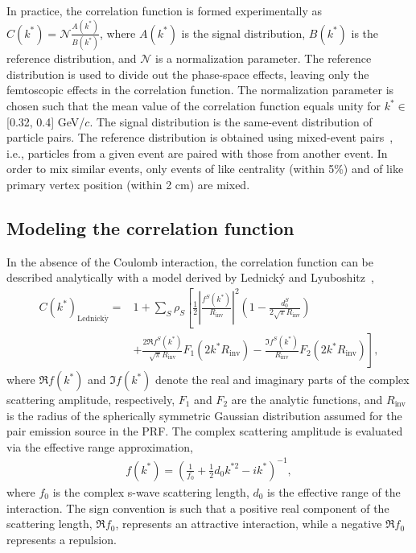 \documentclass{svproc}
\newcommand{\kstar}{$k^{*}$\xspace}
\begin{document}
In practice, the correlation function is formed experimentally as $C(k^{*}) = \mathcal{N}\frac{A(k^{*})}{B(k^{*})}$, where $A(k^{*})$ is the signal distribution, $B(k^{*})$ is the reference distribution, and $\mathcal{N}$ is a normalization parameter.  
The reference distribution is used to divide out the phase-space effects, leaving only the femtoscopic effects in the correlation function. 
The normalization parameter is chosen such that the mean value of the correlation function equals unity for \kstar $\in$ [0.32, 0.4] GeV/$c$.
The signal distribution is the same-event distribution of particle pairs.
The reference distribution is obtained using mixed-event pairs~\cite{Kopylov:1974th}, i.e., particles from a given event are paired with those from another event.
In order to mix similar events, only events of like centrality (within 5\%) and of like primary vertex position (within 2 cm) are mixed.

\subsection{Modeling the correlation function}
\label{sec:ModelingCF}

In the absence of the Coulomb interaction, the correlation function can be described analytically with a model derived by Lednick\'y and Lyuboshitz~\cite{Lednicky:82},
\begin{equation}
\begin{aligned}
C(k^{*})_{\mathrm{Lednick\acute{y}}} = &1 + \sum_{S}\rho_{S}\left[\frac{1}{2}\left|\frac{f^{S}(k^{*})}{R_{\mathrm{inv}}}\right|^2\left(1-\frac{d^{S}_{0}}{2\sqrt{\pi}R_{\mathrm{inv}}}\right) \right. \\
&+ \left. \frac{2\Re f^{S}(k^{*})}{\sqrt{\pi}R_{\mathrm{inv}}}F_{1}(2k^{*}R_{\mathrm{inv}})-\frac{\Im f^{S}(k^{*})}{R_{\mathrm{inv}}}F_{2}(2k^{*}R_{\mathrm{inv}})\right],
\end{aligned}  
\label{eqn:LednickyEqn}
\end{equation}
where $\Re f(k^{*})$ and $\Im f(k^{*})$ denote the real and imaginary parts of the complex scattering amplitude, respectively, $F_{1}$ and $F_{2}$ are the analytic functions, and $R_{\mathrm{inv}}$ is the radius of the spherically symmetric Gaussian distribution assumed for the pair emission source in the PRF.
The complex scattering amplitude is evaluated via the effective range approximation,
\begin{equation}
\begin{aligned}
f(k^{*}) = \left( \frac{1}{f_{0}} + \frac{1}{2}d_{0}k^{*2} - ik^{*} \right)^{-1},
\end{aligned}
\label{eqn:ScatteringParam}
\end{equation}
where $f_{0}$ is the complex s-wave scattering length, $d_{0}$ is the effective range of the interaction.
The sign convention is such that a positive real component of the scattering length, $\Re f_{0}$, represents an attractive interaction, while a negative $\Re f_{0}$ represents a repulsion.
\end{document}
